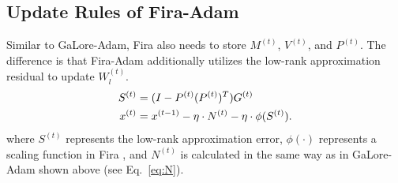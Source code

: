 \subsection{Update Rules of Fira-Adam}
\label{sub:preliminaries:fira}

Similar to GaLore-Adam, Fira also needs to store $M^{(t)}$, $V^{(t)}$, and $P^{(t)}$. The difference is that Fira-Adam additionally utilizes the low-rank approximation residual to update $W_l^{(t)}$.
\begin{align*}
    S^{(t)} &= (I-P^{(t)}(P^{(t)})^T) G^{(t)} \notag\\
    x^{(t)} &= x^{(t-1)} - \eta\cdot N^{(t)}-\eta \cdot \phi(S^{(t)})\notag.
\end{align*}
where $S^{(t)}$ represents the low-rank approximation error, $\phi(\cdot)$ represents a scaling function in Fira \cite{chen2024fira}, and $N^{(t)}$ is calculated in the same way as in GaLore-Adam shown above (see Eq.~\eqref{eq:N}). 

